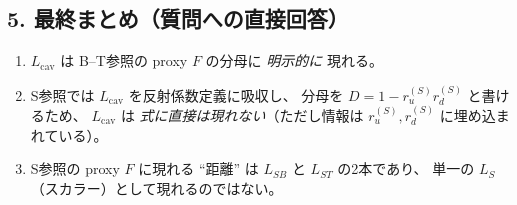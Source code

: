 \subsection*{5. 最終まとめ（質問への直接回答）}

\begin{enumerate}
\item \(\boxed{L_{\mathrm{cav}}}\) は B--T参照の proxy \(F\) の分母に \emph{明示的に} 現れる。
\item S参照では \(\boxed{L_{\mathrm{cav}}}\) を反射係数定義に吸収し、
分母を \(D=1-r_u^{(S)}r_d^{(S)}\) と書けるため、
\(\boxed{L_{\mathrm{cav}}}\) は \emph{式に直接は現れない}（ただし情報は \(r_u^{(S)}, r_d^{(S)}\) に埋め込まれている）。
\item S参照の proxy \(F\) に現れる ``距離'' は
\(\boxed{L_{SB}}\) と \(\boxed{L_{ST}}\) の2本であり、
単一の \(\boxed{L_S}\)（スカラー）として現れるのではない。
\end{enumerate}



